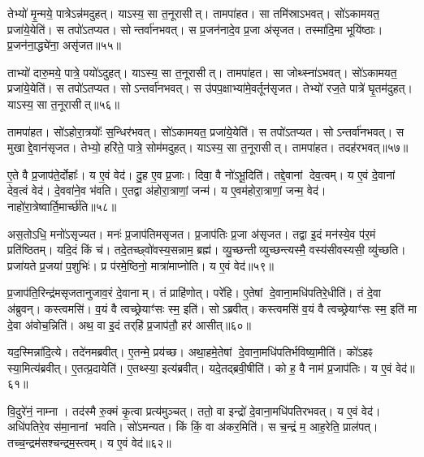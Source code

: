 तेभ्यो॑ मृ॒न्मये॒ पात्रे\-ऽन्न॑मदुहत्।
याऽस्य॒ सा त॒नूरासीत्।
तामपा॑हत।
सा तमि॑स्रा\-ऽभवत्।
सो॑ऽकामयत॒ प्रजा॑ये॒येति॑।
स तपो॑\-ऽतप्यत।
सोन्तर्वा॑नभवत्।
स प्र॒जन॑नादे॒व प्र॒जा अ॑सृजत।
तस्मा॑दि॒मा भूयि॑ष्ठाः।
प्र॒जन॑ना॒द्ध्ये॑ना॒ असृ॑जत॥५५॥

ताभ्यो॑ दारु॒मये॒ पात्रे॒ पयो॑\-ऽदुहत्।
याऽस्य॒ सा त॒नूरासीत्।
तामपा॑हत।
सा जोथ्स्ना॑\-ऽभवत्।
सो॑ऽकामयत॒ प्रजा॑ये॒येति॑।
स तपो॑\-ऽतप्यत।
सोऽन्तर्वा॑नभवत्।
स उ॑पप॒क्षाभ्या॑मे॒वर्तून॑सृजत।
तेभ्यो॑ रज॒ते पात्रे॑ घृ॒तम॑दुहत्।
याऽस्य॒ सा त॒नूरासीत्॥५६॥

तामपा॑हत।
सो॑ऽहोरा॒त्रयोः᳚ स॒न्धिर॑भवत्।
सो॑ऽकामयत॒ प्रजा॑ये॒येति॑।
स तपो॑\-ऽतप्यत।
सोऽन्तर्वा॑नभवत्।
स मुखाद्दे॒वान॑सृजत।
तेभ्यो॒ हरि॑ते॒ पात्रे॒ सोम॑मदुहत्।
याऽस्य॒ सा त॒नूरासीत्।
तामपा॑हत।
तदह॑रभवत्॥५७॥

ए॒ते वै प्र॒जाप॑ते॒र्दोहाः᳚।
य ए॒वं वेद॑।
दु॒ह ए॒व प्र॒जाः।
दिवा॒ वै नो॑\-ऽभू॒दिति॑।
तद्दे॒वानां देव॒त्वम्।
य ए॒वं दे॒वानां देव॒त्वं वेद॑।
दे॒ववा॑ने॒व भ॑वति।
ए॒तद्वा अ॑होरा॒त्राणां॒ जन्म॑।
य ए॒वम॑होरा॒त्राणां॒ जन्म॒ वेद॑।
नाहो॑रा॒त्रेष्वार्ति॒मार्च्छ॑ति॥५८॥

अस॒तोऽधि॒ मनो॑\-ऽसृज्यत।
मनः॑ प्र॒जाप॑तिमसृजत।
प्र॒जाप॑तिः प्र॒जा अ॑सृजत।
तद्वा इ॒दं मन॑स्ये॒व प॑र॒मं प्रति॑ष्ठितम्।
यदि॒दं किं च॑।
तदे॒तच्छ्वो॑वस्य॒सन्नाम॒ ब्रह्म॑।
व्यु॒च्छन्तीव्युच्छन्त्यस्मै॒ वस्य॑सीवस्यसी॒ व्यु॑च्छति।
प्रजा॑यते प्र॒जया॑ प॒शुभिः॑।
प्र प॑रमे॒ष्ठिनो॒ मात्रा॑माप्नोति।
य ए॒वं वेद॑॥५९॥

प्र॒जाप॑ति॒रिन्द्र॑मसृजतानुजाव॒रं दे॒वानाम्।
तं प्राहि॑णोत्।
परे॑हि।
ए॒तेषां दे॒वाना॒मधि॑पतिरे॒धीति॑।
तं दे॒वा अ॑ब्रुवन्।
कस्त्वमसि॑।
व॒यं वै त्वच्छ्रेयाꣳ॑सः स्म॒ इति॑।
सोऽब्रवीत्।
कस्त्वमसि॑ व॒यं वै त्वच्छ्रेयाꣳ॑सः स्म॒ इति॑ मा दे॒वा अ॑वोच॒न्निति॑।
अथ॒ वा इ॒दं तर्‌\mbox{}हि॑ प्र॒जाप॑तौ॒ हर॑ आसीत्॥६०॥

यद॒स्मिन्ना॑दि॒त्ये।
तदे॑नमब्रवीत्।
ए॒तन्मे॒ प्रय॑च्छ।
अथा॒हमे॒तेषां दे॒वाना॒मधि॑पतिर्भविष्या॒मीति॑।
को॑ऽहꣴ स्या॒मित्य॑ब्रवीत्।
ए॒तत्प्र॒दायेति॑।
ए॒तथ्स्या॒ इत्य॑ब्रवीत्।
यदे॒तद्ब्रवी॒षीति॑।
को ह॒ वै नाम॑ प्र॒जाप॑तिः।
य ए॒वं वेद॑॥६१॥

वि॒दुरे॑नं॒ नाम्ना।
तद॑स्मै रु॒क्मं कृ॒त्वा प्रत्य॑मुञ्चत्।
ततो॒ वा इन्द्रो॑ दे॒वाना॒मधि॑पतिरभवत्।
य ए॒वं वेद॑।
अधि॑पतिरे॒व स॑मा॒नानां भवति।
सो॑ऽमन्यत।
किं किं॒ वा अ॑कर॒मिति॑।
स च॒न्द्रं म॒ आह॒रेति॒ प्राल॑पत्।
तच्च॒न्द्रम॑सश्चन्द्रम॒स्त्वम्।
य ए॒वं वेद॑॥६२॥

